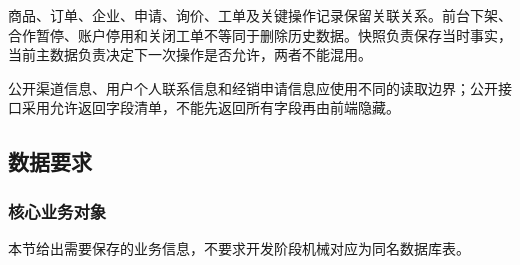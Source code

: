 
商品、订单、企业、申请、询价、工单及关键操作记录保留关联关系。前台下架、合作暂停、账户停用和关闭工单不等同于删除历史数据。快照负责保存当时事实，当前主数据负责决定下一次操作是否允许，两者不能混用。

公开渠道信息、用户个人联系信息和经销申请信息应使用不同的读取边界；公开接口采用允许返回字段清单，不能先返回所有字段再由前端隐藏。

\subsection{数据要求}\label{sec:34-数据要求}

\subsubsection{核心业务对象}\label{sec:341-核心业务对象}

本节给出需要保存的业务信息，不要求开发阶段机械对应为同名数据库表。

